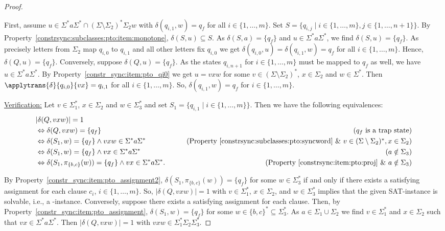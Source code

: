 \begin{proof}
\begin{enumerate}
 First, assume $u \in \Sigma^* a \Sigma^* \cap (\Sigma \setminus \Sigma_2)^*\Sigma_2 w$
 with  $\delta(q_{i,1}, w) = q_f$ for all $i \in \{1,\ldots,m\}$.
 Set $S = \{ q_{i,j} \mid i \in \{1,\ldots,m\}, j \in \{1,\ldots,n+1\}\}$.
 By Property~\ref{constrsync:subclasses:pto:item:monotone}, $\delta(S, u) \subseteq S$.
 As $\delta(S, a) = \{q_f\}$ and $u \in \Sigma^*a\Sigma^*$,
 we find $\delta(S, u) = \{q_f\}$.
 As precisely letters from $\Sigma_2$ map $q_{i,0}$ to $q_{i,1}$ and all other letters fix $q_{i,0}$ 
 we get $\delta(q_{i,0}, u) = \delta(q_{i,1}, w) = q_f$
 for all $i \in \{1,\ldots,m\}$.
 Hence, $\delta(Q, u) = \{q_f\}$.
 Conversely, suppose $\delta(Q, u) = \{q_f\}$.
 As the states $q_{i,n+1}$ for $i \in \{1,\ldots,m\}$
 must be mapped to $q_f$ as well, we have $u \in \Sigma^* a \Sigma^*$.  
 By Property~\ref{constr_sync:item:pto_qi0} 
 we get $u = vxw$ for some $v \in (\Sigma\setminus\Sigma_2)^*$, $x \in \Sigma_2$
 and $w \in \Sigma^*$.
 Then $\applytrans{\delta}{q_{i,0}}{vx} = q_{i,1}$
 for all $i \in \{1,\ldots,m\}$.
 So, $\delta(q_{i,1}, w) = q_f$ for $i \in \{1,\ldots,m\}$.
\end{enumerate}

\noindent\underline{Verification:} Let $v \in \Sigma_1^*$, $x \in \Sigma_2$ and $w \in \Sigma_3^*$
and set $S_1 = \{ q_{i,1} \mid i \in \{1,\ldots,m\}\}$.
Then we have the following equivalences:
\begin{align*}
& |\delta(Q, vxw)| = 1 \\
& \Leftrightarrow  \delta(Q, vxw) = \{q_f\} & \tag{$q_f$ is a trap state} \\
& \Leftrightarrow  \delta(S_1, w) = \{q_f\} \land vxw \in \Sigma^* a \Sigma^* & \tag{Property~\ref{constrsync:subclasses:pto:syncword} \& $v \in (\Sigma\setminus\Sigma_2)^*, x \in \Sigma_2$} \\
& \Leftrightarrow  \delta(S_1, w) = \{q_f\} \land vx \in \Sigma^* a \Sigma^* & \tag{$a \notin \Sigma_3$} \\
& \Leftrightarrow  \delta(S_1, \pi_{\{b,c\}}(w)) = \{q_f\} \land vx \in \Sigma^* a \Sigma^*. & \tag{Property~\ref{constrsync:item:pto:proj} \& $a \notin \Sigma_3$} 
\end{align*}  

By Property~\ref{constr_sync:item:pto_assignment2},
$\delta(S_1, \pi_{\{b,c\}}(w)) = \{q_f\}$ for some  $w \in \Sigma_3^*$
if and only if there exists a satisfying assignment for each clause $c_i$, $i \in \{1,\ldots,m\}$. 
So, $|\delta(Q, vxw)| = 1$ with $v \in \Sigma_1^*$, $x \in \Sigma_2$,
and $w \in \Sigma_3^*$ implies that the given {\sc SAT}-instance
is solvable, i.e., a \rYES-instance.
Conversely, suppose there exists a satisfying assignment for each clause.
Then, by Property~\ref{constr_sync:item:pto_assignment},
$\delta(S_1, w) = \{q_f\}$
for some $w \in \{b,c\}^* \subseteq \Sigma_3^*$.
As $a \in \Sigma_1\cup \Sigma_2$ we find $v \in \Sigma_1^*$
and $x \in \Sigma_2$ such that $vx \in \Sigma^* a \Sigma^*$.
Then $|\delta(Q, vxw)| = 1$ with $vxw \in \Sigma_1^*\Sigma_{2}\Sigma_3^*$.
\end{proof}

